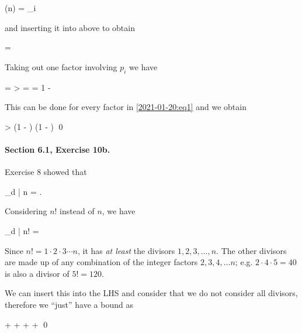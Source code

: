 \bee
\sigma(n) = \prod_i 
\eee

and inserting it into above to obtain

\be\label{2021-01-20:eq1}
 = 
\ee

Taking out one factor involving $p_i$ we have

\bee
{} =  >  =  = 1 - 
\eee

This can be done for every factor in \eqref{2021-01-20:eq1} and we obtain

\bee
{} > \left(1 - \right) \cdots \left(1 - \right) \qed
\eee


\paragraph{Section 6.1, Exercise 10b.} Exercise $8$ showed that 

\bee
\sum_{d | n}  = .
\eee

Considering $n!$ instead of $n$, we have

\bee
\sum_{d | n!}  = 
\eee

Since $n! = 1 \cdot 2 \cdot 3 \cdots n$, it has \emph{at least} the divisors $1, 2, 3, \ldots, n$. The other divisors are made up of any combination of the integer factors $2, 3, 4, \ldots n$; e.g. $2 \cdot 4 \cdot 5 = 40$ is also a divisor of $5! = 120$.



We can insert this into the LHS and consider that we do not consider all divisors, therefore we ``just'' have a bound as

\bee
{} +  +  + \cdots +  \leq {} \qed
\eee





